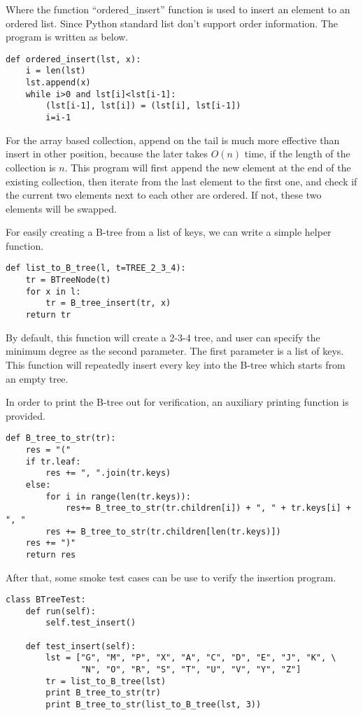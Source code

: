 \documentclass{article}
\begin{document}
Where the function ``ordered\_insert'' function is used to insert an element
to an ordered list. Since Python standard list don't support order information.
The program is written as below.

\begin{lstlisting}
def ordered_insert(lst, x):
    i = len(lst)
    lst.append(x)
    while i>0 and lst[i]<lst[i-1]:
        (lst[i-1], lst[i]) = (lst[i], lst[i-1])
        i=i-1
\end{lstlisting}

For the array based collection, append on the tail is much more effective than
insert in other position, because the later takes $O(n)$ time, if the length
of the collection is $n$. This program will first append the new element at
the end of the existing collection, then iterate from the last element to
the first one, and check if the current two elements next to each other
are ordered. If not, these two elements will be swapped. 

For easily creating a B-tree from a list of keys, we can write a simple helper
function.

\begin{lstlisting}
def list_to_B_tree(l, t=TREE_2_3_4):
    tr = BTreeNode(t)
    for x in l:
        tr = B_tree_insert(tr, x)
    return tr
\end{lstlisting}

By default, this function will create a 2-3-4 tree, and user can specify the
minimum degree as the second parameter. The first parameter is a list of keys.
This function will repeatedly insert every key into the B-tree which starts
from an empty tree.

In order to print the B-tree out for verification, an auxiliary printing
function is provided.

\begin{lstlisting}
def B_tree_to_str(tr):
    res = "("
    if tr.leaf:
        res += ", ".join(tr.keys)
    else:
        for i in range(len(tr.keys)):
            res+= B_tree_to_str(tr.children[i]) + ", " + tr.keys[i] + ", "
        res += B_tree_to_str(tr.children[len(tr.keys)])
    res += ")"
    return res
\end{lstlisting}

After that, some smoke test cases can be use to verify the insertion 
program.

\begin{lstlisting}
class BTreeTest:
    def run(self):
        self.test_insert()

    def test_insert(self):
        lst = ["G", "M", "P", "X", "A", "C", "D", "E", "J", "K", \
               "N", "O", "R", "S", "T", "U", "V", "Y", "Z"]
        tr = list_to_B_tree(lst)
        print B_tree_to_str(tr)
        print B_tree_to_str(list_to_B_tree(lst, 3))
\end{lstlisting}
\end{document}
